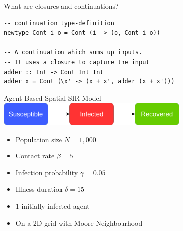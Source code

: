 \documentclass{beamer} %
\begin{document}
\begin{frame}[fragile]{What are closures and continuations?}
\begin{block}{}
\begin{verbatim}
-- continuation type-definition
newtype Cont i o = Cont (i -> (o, Cont i o))

-- A continuation which sums up inputs.
-- It uses a closure to capture the input
adder :: Int -> Cont Int Int
adder x = Cont (\x' -> (x + x', adder (x + x')))
\end{verbatim}
\end{block}
\end{frame}

\begin{frame}{Agent-Based Spatial SIR Model}
  \includegraphics[width=0.7\textwidth]{./fig/SIR_transitions.png}
  
  \begin{itemize}
    \item Population size $N = 1,000$
 	\item Contact rate $\beta = 5$
 	\item Infection probability $\gamma = 0.05$
 	\item Illness duration $\delta = 15$
 	\item 1 initially infected agent
 	\item On a 2D grid with Moore Neighbourhood
  \end{itemize}
\end{frame}
\end{document}
